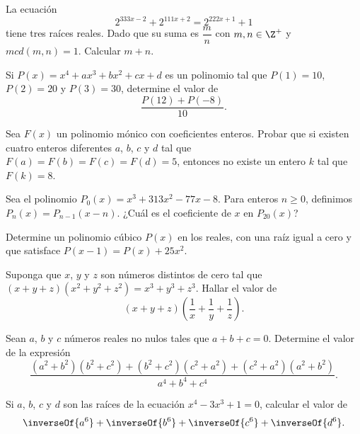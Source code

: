 \begin{problem}
    La ecuación
    \[
        2^{333x - 2} + 2^{111x + 2} = 2^{222x + 1} + 1
    \]
    tiene tres raíces reales.
    Dado que su suma es $\dfrac{m}{n}$ con $m, n \in \Z^{+}$ y $mcd(m, n) = 1$.
    Calcular $m + n$.
\end{problem}

\begin{problem}
    Si $P(x) = x^4 + ax^3 + bx^2 + cx + d$ es un polinomio tal que $P(1) = 10$, $P(2) = 20$ y $P(3) = 30$, determine el valor de
    \[\frac{P(12) + P(-8)}{10}.\]
\end{problem}

\begin{problem}
    Sea $F(x)$ un polinomio mónico con coeficientes enteros.
    Probar que si existen cuatro enteros diferentes $a$, $b$, $c$ y $d$ tal que $F(a) = F(b) = F(c)  = F(d) = 5$,
    entonces no existe un entero $k$ tal que $F(k) = 8$.
\end{problem}

\begin{problem}
    Sea el polinomio $P_0(x) = x^3 + 313x^2 - 77x - 8$.
    Para enteros $n \geq 0$, definimos $P_n(x) = P_{n - 1}(x - n)$.
    ¿Cuál es el coeficiente de $x$ en $P_{20}(x)$?
\end{problem}

\begin{problem}
    Determine un polinomio cúbico $P(x)$ en los reales, con una raíz igual a cero y que satisface $P(x - 1) = P(x) + 25x^2$.
\end{problem}

\begin{problem}
    Suponga que $x$, $y$ y $z$ son números distintos de cero tal que $(x + y + z)(x^2 + y^2 + z^2) = x^3 + y^3 + z^3$.
    Hallar el valor de
    \[(x + y + z)\left(\frac{1}{x} + \frac{1}{y} + \frac{1}{z}\right).\]
\end{problem}

\begin{problem}
    Sean $a$, $b$ y $c$ números reales no nulos tales que $a + b + c = 0$.
    Determine el valor de la expresión
    \[\frac{(a^2 + b^2)(b^2 + c^2) + (b^2 + c^2)(c^2 + a^2) + (c^2 + a^2)(a^2 + b^2)}{a^4 + b^4 + c^4}.\]
\end{problem}

\begin{problem}
    Si $a$, $b$, $c$ y $d$ son las raíces de la ecuación $x^4 - 3x^3 + 1 = 0$,
    calcular el valor de
    \[\inverseOf{a^6} + \inverseOf{b^6} + \inverseOf{c^6} + \inverseOf{d^6}.\]
\end{problem}